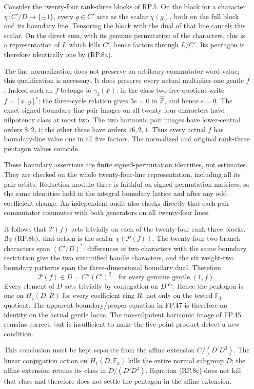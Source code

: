Consider the twenty-four rank-three blocks of RP.5.
On the block for a character $\chi:C'/D\to\{\pm1\}$,
every $g\in C'$ acts as the scalar $\chi(g)$, both
on the full block and its boundary line. Tensoring
the block with the dual of that line cancels this
scalar. On the direct sum, with its genuine
permutation of the characters, this is a representation
of $L$ which kills $C'$, hence factors through $L/C'$.
Its pentagon is therefore identically one by (RP.8a).

The line normalization does not preserve an arbitrary
commutator-word value; this qualification is necessary.
It does preserve every actual multiplier-one gentle
$f$. Indeed such an $f$ belongs to $\gamma_3(F)$:
in the class-two free quotient write $f=[x,y]^e$;
the three-cycle relation gives $3e=0$ in
$\widehat{\mathbb Z}$, and hence $e=0$.
The exact signed boundary-line pair images on all
twenty-four characters have nilpotency class at most
two. The two harmonic pair images have lower-central
orders $8,2,1$; the other three have orders $16,2,1$.
Thus every actual $f$ has boundary-line value one
in all five factors. The normalized and original
rank-three pentagon values coincide.

These boundary assertions are finite signed-permutation
identities, not estimates. They are checked on the
whole twenty-four-line representation, including all
its pair orbits. Reduction modulo three is faithful
on signed permutation matrices, so the same identities
hold in the integral boundary lattice and after any
odd coefficient change. An independent audit also
checks directly that each pair commutator commutes
with both generators on all twenty-four lines.

It follows that $\mathcal P(f)$ acts trivially on
each of the twenty-four rank-three blocks. By
(RP.8b), that action is the scalar
$\chi(\mathcal P(f))$. The twenty-four two-branch
characters span $(C'/D)^*$: differences of two
characters with the same boundary restriction
give the two unramified handle characters, and
the six weight-two boundary patterns span the
three-dimensional boundary dual. Therefore
\[
                \boxed{\ \mathcal P(f)\in D
                    =C''(C')^2\quad
                    \text{for every genuine gentle }(1,f).\ }
 \tag{RP.8c}
\]
Every element of $D$ acts trivially by conjugation
on $D^{\rm ab}$. Hence the pentagon is one on
$H_1(D,R)$ for every coefficient ring $R$, not
only on the tested $\mathbb F_3$ quotient.
The apparent boundary/proper equation in FP.47
is therefore an identity on the actual gentle
locus. The non-nilpotent harmonic image of
FP.45 remains correct, but is insufficient
to make the five-point product detect a new
condition.

This conclusion must be kept separate from
the affine extension
$C/(D'D^3)$. The linear conjugation action
on $H_1(D,\mathbb F_3)$ kills the entire
normal subgroup $D$; the affine extension
retains its class in $D/(D'D^3)$. Equation
(RP.8c) does not kill that class and therefore
does not settle the pentagon in the affine
extension.
